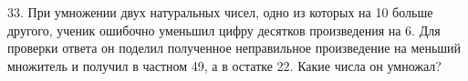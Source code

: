 33. При умножении двух натуральных чисел, одно из которых на 10 больше другого, ученик ошибочно уменьшил цифру десятков произведения на 6. Для проверки ответа он поделил полученное неправильное произведение на меньший множитель и получил в частном 49, а в остатке 22. Какие числа он умножал?\\
